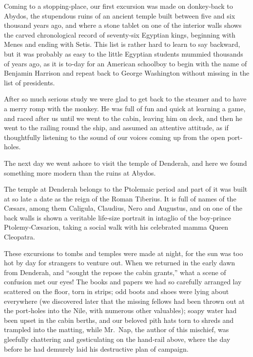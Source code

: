 \documentclass[12pt]{book}
\begin{document}
Coming to a stopping‐place, our first excursion was made on donkey‐back
to Abydos, the stupendous ruins of an ancient temple built between five and six
thousand years ago, and where a stone tablet on one of the interior walls shows
the carved chronological record of seventy‐six Egyptian kings, beginning with
Menes and ending with Setis. This list is rather hard to learn to say backward,
but it was probably as easy to the little Egyptian students mummied thousands of
years ago, as it is to‐day for an American schoolboy to begin with the name of
Benjamin Harrison and repeat back to George Washington without missing in
the list of presidents.

After so much serious study we were glad to get back to the steamer and to
have a merry romp with the monkey. He was full of fun and quick at learning
a game, and raced after us until we went to the cabin, leaving him on deck, and
then he went to the railing round the ship, and assumed an attentive attitude,
as if thoughtfully listening to the sound of our voices coming up from the open
port‐holes.

The next day we went ashore to visit the temple of Denderah, and here we
found something more modern than the ruins at Abydos.

The temple at Denderah belongs to the Ptolemaic period and part of it was
built at so late a date as the reign of the Roman Tiberius. It is full of names
of the Cæsars, among them Caligula, Claudius, Nero and Augustus, and on
one of the back walls is shown a veritable life‐size portrait in intaglio of the
boy‐prince Ptolemy‐Cæsarion, taking a social walk with his celebrated mamma
Queen Cleopatra.

These excursions to tombs and temples were made at night, for the sun was too
hot by day for strangers to venture out. When we returned in the early dawn from
Denderah, and “sought the repose the cabin grants,” what a scene of confusion
met our eyes! The books and papers we had so carefully arranged lay scattered
on the floor, torn in strips; odd boots and shoes were lying about everywhere (we
discovered later that the missing fellows had been thrown out at the port‐holes
into the Nile, with numerous other valuables); soapy water had been upset in
the cabin berths, and our beloved pith hats torn to shreds and trampled into the
matting, while Mr.~Nap, the author of this mischief, was gleefully chattering and
gesticulating on the hand‐rail above, where the day before he had demurely laid
his destructive plan of campaign.
\end{document}
